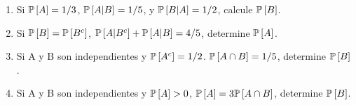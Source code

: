 \begin{Ejer}
\begin{enumerate}
\item Si $\mathbb{P}\left[A\right]=1/3$, $\mathbb{P}\left[A|B\right]=1/5$, y $\mathbb{P}\left[B|A\right]=1/2$, calcule $\mathbb{P}\left[B\right]$.

\item Si $\mathbb{P}\left[B\right]=\mathbb{P}\left[B^{c}\right]$, $\mathbb{P}\left[A|B^{c}\right]+\mathbb{P}\left[A|B\right]=4/5$, determine $\mathbb{P}\left[A\right]$.

\item Si A y B son independientes y $\mathbb{P}\left[A^{c}\right]=1/2$. $\mathbb{P}\left[A\cap B\right]=1/5$, determine $\mathbb{P}\left[B\right]$.

\item Si A y B son independientes y $\mathbb{P}\left[A\right]>0$, $\mathbb{P}\left[A\right]=3\mathbb{P}\left[A\cap B\right]$, determine $\mathbb{P}\left[B\right]$.

\end{enumerate}
\end{Ejer}

